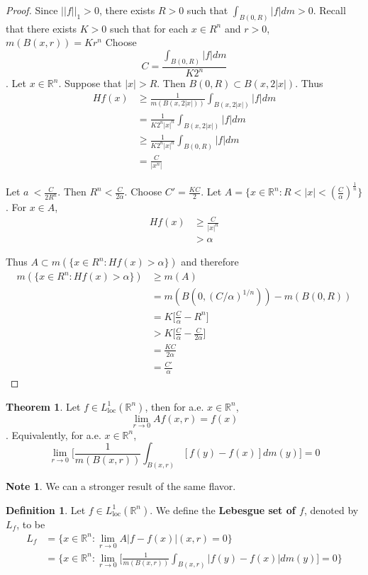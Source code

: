 \documentclass[12pt]{amsart}
\theoremstyle{definition}
\newtheorem{defn}[definition]{Definition}
\newtheorem{note}[definition]{Note}
\newtheorem{thm}[definition]{Theorem}
\newcommand{\al}{\alpha}
\newcommand{\R}{\mathbb{R}}
\newcommand{\Ll}{L^1_{\text{loc}}(\R^n)}
\newcommand{\ld}[1]{\label{defn:#1}}
\begin{document}
	\begin{proof}
		Since $||f||_1 >0$, there exists $R>0$ such that $\int_{B(0,R)}|f|dm >0$. Recall that there exists $K>0$ such that for each $x \in R^n$ and $r>0$, $m(B(x,r)) = Kr^n$ Choose $$C = \frac{\int_{B(0,R)}|f|dm}{K2^n}$$. Let $x \in \R^n$. Suppose that $|x|>R$. Then $B(0,R) \subset B(x,2|x|)$. Thus 
		\begin{align*}
			Hf(x) 
			&\geq \frac{1}{m(B(x,2|x|))}\int_{B(x,2|x|)}|f|dm\\
			&= \frac{1}{K2^n|x|^n}\int_{B(x,2|x|)}|f|dm \\
			&\geq \frac{1}{K2^n|x|^n}\int_{B(0,R)}|f|dm \\
			&= \frac{C}{|x^n|}
		\end{align*}
		
		Let $a\ < \frac{C}{2R^n}$. Then $R^n < \frac{C}{2 \al}$. Choose $C' =\frac{KC}{2}$. Let $A = \{x \in \R^n: R < |x|< (\frac{C}{\al})^{\frac{1}{n}}\}$. For $x \in A$, 
		\begin{align*}
			Hf(x) 
			&\geq \frac{C}{|x|^n} \\
			& > \al
		\end{align*}
		
		Thus $A \subset m(\{x \in R^n: Hf(x)> \al\})$ and therefore 
		\begin{align*}
			m(\{x \in R^n: Hf(x)> \al\}) 
			&\geq m(A) \\
			&= m(B(0,(C/\al)^{1/n})) - m(B(0,R)) \\
			&= K\bigg [\frac{C}{\al} - R^n \bigg] \\
			&> K\bigg[\frac{C}{\al} - \frac{C}{2 \al}\bigg] \\
			&= \frac{KC}{2 \al}\\
			&= \frac{C'}{\al}
		\end{align*}
	\end{proof}
	
	\begin{thm}
		Let $f \in \Ll$, then for a.e. $x \in \R^n$, $$\lim_{r \rightarrow 0} Af(x,r) =f(x)$$. Equivalently, for a.e. $x \in \R^n$, $$ \lim_{r \rightarrow 0} \bigg[ \frac{1}{m(B(x,r))}\int_{B(x,r)}[f(y)-f(x)]dm(y)\bigg] =0$$
	\end{thm}
	
	\begin{note}
		We can a stronger result of the same flavor.
	\end{note}
	
	\begin{defn} \ld{00000} 
		Let $f \in \Ll$. We define the \textbf{Lebesgue set of $f$}, denoted by $L_f$, to be 
		\begin{align*}
			L_f 
			&= \{x \in \R^n: \lim_{r \rightarrow 0} A|f-f(x)|(x,r) =0 \}\\
			&= \bigg \{x \in \R^n: \lim_{r \rightarrow 0} \bigg[ \frac{1}{m(B(x,r))}\int_{B(x,r)}|f(y) - f(x)|dm(y)\bigg] =0 \bigg \}
		\end{align*}
	\end{defn}
	
\end{document}
